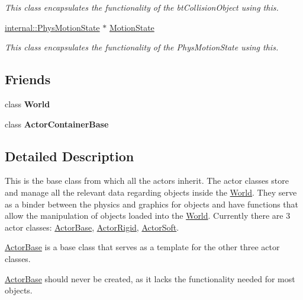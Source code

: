 \begin{DoxyCompactItemize}
\begin{DoxyCompactList}\small\item\em This class encapsulates the functionality of the btCollisionObject using this. \item\end{DoxyCompactList}\item 
\hypertarget{classphys_1_1ActorBase_ab776527aa927b8787313c50530cc24ba}{
\hyperlink{classphys_1_1internal_1_1PhysMotionState}{internal::PhysMotionState} $\ast$ \hyperlink{classphys_1_1ActorBase_ab776527aa927b8787313c50530cc24ba}{MotionState}}
\label{d8/d0f/classphys_1_1ActorBase_ab776527aa927b8787313c50530cc24ba}

\begin{DoxyCompactList}\small\item\em This class encapsulates the functionality of the PhysMotionState using this. \item\end{DoxyCompactList}\end{DoxyCompactItemize}
\subsection*{Friends}
\begin{DoxyCompactItemize}
\item 
\hypertarget{classphys_1_1ActorBase_a7b4bcdf992c21ae83363f25df05b1d25}{
class {\bfseries World}}
\label{d8/d0f/classphys_1_1ActorBase_a7b4bcdf992c21ae83363f25df05b1d25}

\item 
\hypertarget{classphys_1_1ActorBase_a54042fcfa7ab444a50ec79cbe3395356}{
class {\bfseries ActorContainerBase}}
\label{d8/d0f/classphys_1_1ActorBase_a54042fcfa7ab444a50ec79cbe3395356}

\end{DoxyCompactItemize}


\subsection{Detailed Description}
This is the base class from which all the actors inherit. The actor classes store and manage all the relevant data regarding objects inside the \hyperlink{classphys_1_1World}{World}. They serve as a binder between the physics and graphics for objects and have functions that allow the manipulation of objects loaded into the \hyperlink{classphys_1_1World}{World}. Currently there are 3 actor classes: \hyperlink{classphys_1_1ActorBase}{ActorBase}, \hyperlink{classphys_1_1ActorRigid}{ActorRigid}, \hyperlink{classphys_1_1ActorSoft}{ActorSoft}. \par
 \hyperlink{classphys_1_1ActorBase}{ActorBase} is a base class that serves as a template for the other three actor classes. \par
 \hyperlink{classphys_1_1ActorBase}{ActorBase} should never be created, as it lacks the functionality needed for most objects. 

